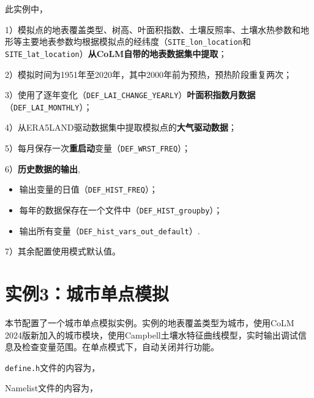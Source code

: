 此实例中，\par
1）模拟点的地表覆盖类型、树高、叶面积指数、土壤反照率、土壤水热参数和地形等主要地表参数均根据模拟点的经纬度（\texttt{SITE\_lon\_location}和\texttt{SITE\_lat\_location}）\textbf{从CoLM自带的地表数据集中提取}；\par
2）模拟时间为1951年至2020年，其中2000年前为预热，预热阶段重复两次；\par
3）使用了逐年变化（\texttt{DEF\_LAI\_CHANGE\_YEARLY}）\textbf{叶面积指数月数据}\\ （\texttt{DEF\_LAI\_MONTHLY}）；\par
4）从ERA5LAND驱动数据集中提取模拟点的\textbf{大气驱动数据}；\par
5）每月保存一次\textbf{重启动}变量（\texttt{DEF\_WRST\_FREQ}）；\par
6）\textbf{历史数据的输出},
\begin{itemize}[nosep,leftmargin=4em]
    \item 输出变量的日值（\texttt{DEF\_HIST\_FREQ}）；
    \item 每年的数据保存在一个文件中（\texttt{DEF\_HIST\_groupby}）；
    \item 输出所有变量（\texttt{DEF\_hist\_vars\_out\_default}）.
\end{itemize} \par
7）其余配置使用模式默认值。

\section{实例3：城市单点模拟}

本节配置了一个城市单点模拟实例。实例的地表覆盖类型为城市，使用CoLM 2024版新加入的城市模块，使用Campbell土壤水特征曲线模型，实时输出调试信息及检查变量范围。在单点模式下，自动关闭并行功能。

\texttt{define.h}文件的内容为，


Namelist文件的内容为，


